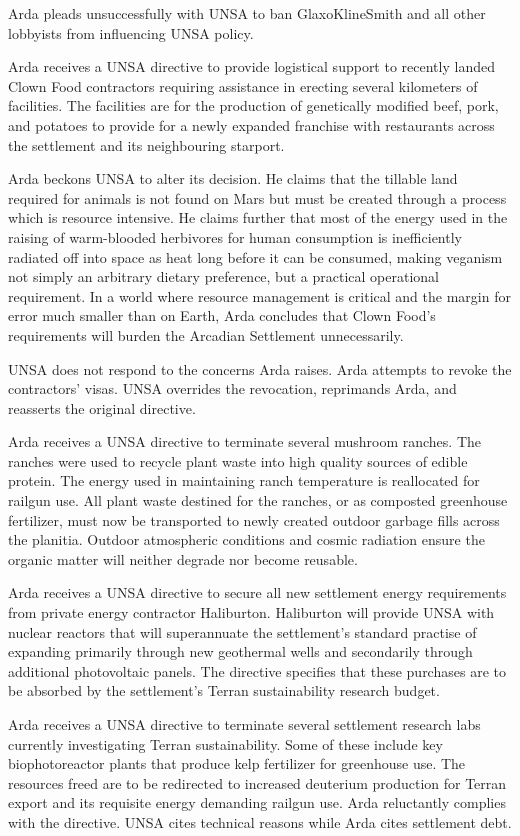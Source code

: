 Arda pleads unsuccessfully with UNSA to ban GlaxoKlineSmith and all other lobbyists from influencing UNSA policy.
\StopTimelineDate

Arda receives a UNSA directive to provide logistical support to recently landed Clown Food contractors requiring assistance in erecting several kilometers of facilities. The facilities are for the production of genetically modified beef, pork, and potatoes to provide for a newly expanded franchise with restaurants across the settlement and its neighbouring starport.

Arda beckons UNSA to alter its decision. He claims that the tillable land required for animals is not found on Mars but must be created through a process which is resource intensive. He claims further that most of the energy used in the raising of warm-blooded herbivores for human consumption is inefficiently radiated off into space as heat long before it can be consumed, making veganism not simply an arbitrary dietary preference, but a practical operational requirement. In a world where resource management is critical and the margin for error much smaller than on Earth, Arda concludes that Clown Food's requirements will burden the Arcadian Settlement unnecessarily. 

UNSA does not respond to the concerns Arda raises. Arda attempts to revoke the contractors' visas. UNSA overrides the revocation, reprimands Arda, and reasserts the original directive.
\StopTimelineDate

Arda receives a UNSA directive to terminate several mushroom ranches. The ranches were used to recycle plant waste into high quality sources of edible protein. The energy used in maintaining ranch temperature is reallocated for railgun use. All plant waste destined for the ranches, or as composted greenhouse fertilizer, must now be transported to newly created outdoor garbage fills across the planitia. Outdoor atmospheric conditions and cosmic radiation ensure the organic matter will neither degrade nor become reusable.
\StopTimelineDate

Arda receives a UNSA directive to secure all new settlement energy requirements from private energy contractor Haliburton. Haliburton will provide UNSA with nuclear reactors that will superannuate the settlement's standard practise of expanding primarily through new geothermal wells and secondarily through additional photovoltaic panels. The directive specifies that these purchases are to be absorbed by the settlement's Terran sustainability research budget.
\StopTimelineDate

Arda receives a UNSA directive to terminate several settlement research labs currently investigating Terran sustainability. Some of these include key biophotoreactor plants that produce kelp fertilizer for greenhouse use. The resources freed are to be redirected to increased deuterium production for Terran export and its requisite energy demanding railgun use. Arda reluctantly complies with the directive. UNSA cites technical reasons while Arda cites settlement debt.
\StopTimelineDate

